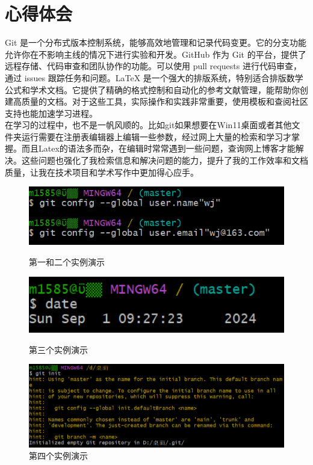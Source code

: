 \documentclass[a4paper, 12pt]{article}
\begin{document}
		\section{心得体会}
		Git 是一个分布式版本控制系统，能够高效地管理和记录代码变更。它的分支功能允许你在不影响主线的情况下进行实验和开发。GitHub 作为 Git 的平台，提供了远程存储、代码审查和团队协作的功能。可以使用 pull requests 进行代码审查，通过 issues 跟踪任务和问题。LaTeX 是一个强大的排版系统，特别适合排版数学公式和学术文档。它提供了精确的格式控制和自动化的参考文献管理，能帮助你创建高质量的文档。对于这些工具，实际操作和实践非常重要，使用模板和查阅社区支持也能加速学习进程。\\
		在学习的过程中，也不是一帆风顺的。比如git如果想要在Win11桌面或者其他文件夹运行需要在注册表编辑器上编辑一些参数，经过网上大量的检索和学习才掌握。而且Latex的语法多而杂，在编辑时常常遇到一些问题，查询网上博客才能解决。这些问题也强化了我检索信息和解决问题的能力，提升了我的工作效率和文档质量，让我在技术项目和学术写作中更加得心应手。
		\begin{figure}[h!]
			\centering
			\listoffigures
			\includegraphics[width=1\textwidth]{1-2}
			\caption{第一和二个实例演示}
			\includegraphics[width=1\textwidth]{3}
			\caption{第三个实例演示}
			\includegraphics[width=1\textwidth]{4}
			\caption{第四个实例演示}
		\end{figure}
\end{document}
